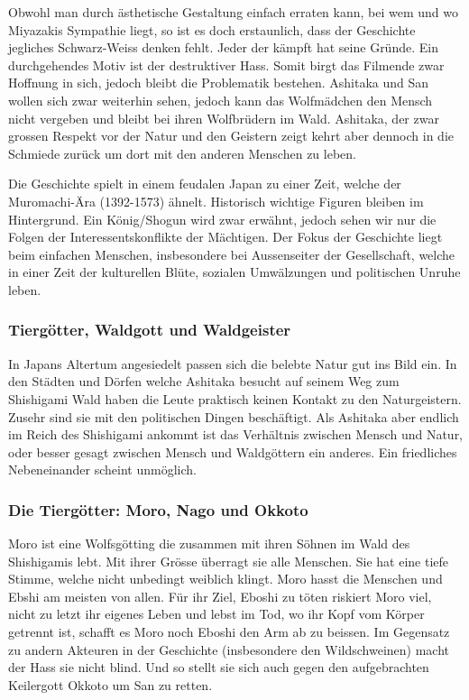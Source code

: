 Obwohl man durch ästhetische Gestaltung einfach erraten kann, bei wem und wo Miyazakis Sympathie liegt, so ist es doch erstaunlich, dass der Geschichte jegliches Schwarz-Weiss denken fehlt. Jeder der kämpft hat seine Gründe. Ein durchgehendes Motiv ist der destruktiver Hass. Somit birgt das Filmende zwar Hoffnung in sich, jedoch bleibt die Problematik bestehen. Ashitaka und San wollen sich zwar weiterhin sehen, jedoch kann das Wolfmädchen den Mensch nicht vergeben und bleibt bei ihren Wolfbrüdern im Wald. Ashitaka, der zwar grossen Respekt vor der Natur und den Geistern zeigt kehrt aber dennoch in die Schmiede zurück um dort mit den anderen Menschen zu leben.  

Die Geschichte spielt in einem feudalen Japan zu einer Zeit, welche der Muromachi-Ära (1392-1573) ähnelt. Historisch wichtige Figuren bleiben im Hintergrund. Ein König/Shogun wird zwar erwähnt, jedoch sehen wir nur die Folgen der Interessentskonflikte der Mächtigen. Der Fokus der Geschichte liegt beim einfachen Menschen, insbesondere bei Aussenseiter der Gesellschaft, welche in einer Zeit der kulturellen Blüte, sozialen Umwälzungen und politischen Unruhe leben. 

\subsubsection{Tiergötter, Waldgott und Waldgeister}
In Japans Altertum angesiedelt passen sich die belebte Natur gut ins Bild ein. In den Städten und Dörfen welche Ashitaka besucht auf seinem Weg zum Shishigami Wald haben die Leute praktisch keinen Kontakt zu den Naturgeistern. Zusehr sind sie mit den politischen Dingen beschäftigt. Als Ashitaka aber endlich im Reich des Shishigami ankommt ist das Verhältnis zwischen Mensch und Natur, oder besser gesagt zwischen Mensch und Waldgöttern ein anderes. Ein friedliches Nebeneinander scheint unmöglich.

\subsubsection*{Die Tiergötter: Moro, Nago und Okkoto}
Moro ist eine Wolfsgötting die zusammen mit ihren Söhnen im Wald des Shishigamis lebt. Mit ihrer Grösse überragt sie alle Menschen. Sie hat eine tiefe Stimme, welche nicht unbedingt weiblich klingt. Moro hasst die Menschen und Ebshi am meisten von allen. Für ihr Ziel, Eboshi zu töten riskiert Moro viel, nicht zu letzt ihr eigenes Leben und lebst im Tod, wo ihr Kopf vom Körper getrennt ist, schafft es Moro noch Eboshi den Arm ab zu beissen. Im Gegensatz zu andern Akteuren in der Geschichte (insbesondere den Wildschweinen) macht der Hass sie nicht blind. Und so stellt sie sich auch gegen den aufgebrachten Keilergott Okkoto um San zu retten.

